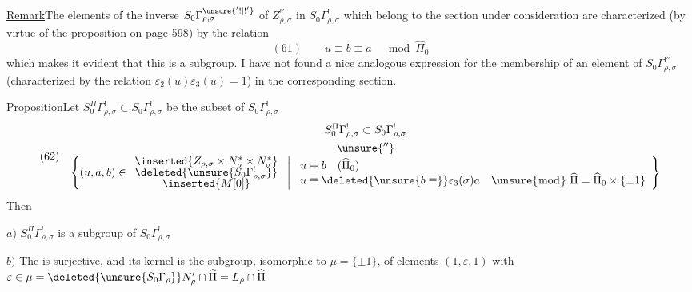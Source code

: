 \uline{Remark}\quad The elements of the inverse 
$S_0\Gamma_{\rho,\sigma}^{\unsure{'!|!'}}$ of $Z_{\rho,\sigma}^{!'}$
in $S_0\Gamma_{\rho,\sigma}^{!}$ which belong to the section under consideration
are characterized (by virtue of the proposition on page 598) by the relation
\[
(61)\qquad u\equiv b\equiv a\quad\bmod\widehat\Pi_0
\]
which makes it evident that this is a subgroup.
I have not found a nice analogous expression for the membership of an
element of $S_0\Gamma_{\rho,\sigma}^{!''}$
(characterized by the relation $\varepsilon_2(u)\varepsilon_3(u)=1$)
in the corresponding section.

\uline{Proposition}\quad Let
$S_0^\Pi\Gamma_{\rho,\sigma}^{!}\subset S_0\Gamma_{\rho,\sigma}^{!}$
be the subset of $S_0\Gamma_{\rho,\sigma}^{!}$
\[
(62)\quad
\begin{gathered}
S_0^\Pi\Gamma_{\rho,\sigma}^{!}\subset S_0\Gamma_{\rho,\sigma}^{!}\\
\unsure{''}\\[-1ex]
\left\{(u,a,b)\in
\begin{array}{c}
\inserted{Z_{\rho,\sigma}\times N_\rho^*\times N_\sigma^*}\\[-.5ex]
\deleted{\unsure{S_0\Gamma_{\rho,\sigma}^{!}}}\\[-.5ex]
\inserted{M[0]}
\end{array}
\ \middle|\ 
\begin{array}{l}
u\equiv b\quad(\widehat\Pi_0)\\
u\equiv\deleted{\unsure{b\equiv}}\varepsilon_3(\sigma)a\quad
\unsure{\bmod}\ \widehat\Pi=\widehat\Pi_0\times\{\pm1\}
\end{array}
\right\}
\end{gathered}
\]
Then

$a)$ $S_0^\Pi\Gamma_{\rho,\sigma}^{!}$ is a subgroup of
$S_0\Gamma_{\rho,\sigma}^{!}$

$b)$ The  
is surjective, and its kernel is the subgroup, isomorphic to
$\mu=\{\pm1\}$, of elements $(1,\varepsilon,1)$ with
$\varepsilon\in\mu=\deleted{\unsure{S_0\Gamma_{\rho}}}
N'_\rho\cap\widehat\Pi=L_\rho\cap\widehat\Pi$

